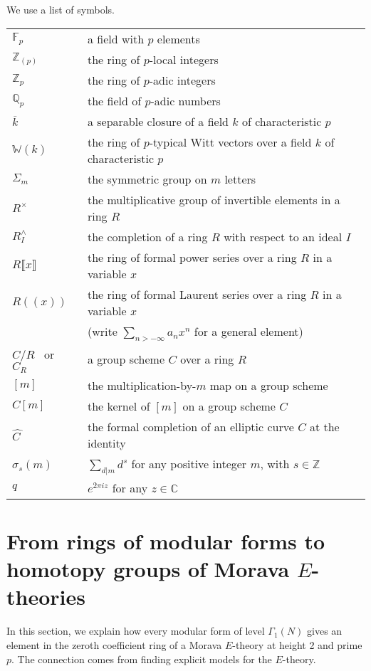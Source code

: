 \documentclass{gtpart}
\theoremstyle{definition}
\theoremstyle{remark}
\newcommand{\mb}[1]{\mathbb{#1}}
\newcommand{\BC}{{\mb C}}
\newcommand{\BF}{{\mb F}}
\newcommand{\BQ}{{\mb Q}}
\newcommand{\BW}{{\mb W}}
\newcommand{\BZ}{{\mb Z}}
\newcommand{\HC}{\widehat{C~}\!}
\newcommand{\G}{\Gamma}
\newcommand{\si}{\sigma}
\newcommand{\lb}{\llbracket}
\newcommand{\rb}{\rrbracket}
\renewcommand{\=}{\approx}
\renewcommand{\-}{\sim}
\numberwithin{equation}{section}
\numberwithin{thm}{section}
\begin{document}
We use a list of symbols.  
\begin{center}
\begin{tabular}{ll}
 $\BF_p$ & a field with $p$ elements \\
 $\BZ_{(p)}$ & the ring of $p$-local integers \\
 $\BZ_p$ & the ring of $p$-adic integers \\
 $\BQ_p$ & the field of $p$-adic numbers \\
 $\overline{k}$ & a separable closure of a field $k$ of characteristic $p$ \\
 $\BW(k)$ & the ring of $p$-typical Witt vectors over a field $k$ of characteristic $p$ \\
 $\Sigma_m$ & the symmetric group on $m$ letters \\
 $R^\times$ & the multiplicative group of invertible elements in a ring $R$ \\
 $R_I^\wedge$ & the completion of a ring $R$ with respect to an ideal $I$ \\
 $R\lb x \rb$ & the ring of formal power series over a ring $R$ in a variable $x$ \\
 $R(\!(x)\!)$ & the ring of formal Laurent series over a ring $R$ in a variable $x$ \\
              & (write $\sum_{n > -\infty} a_n x^n$ for a general element) \\
 $C/R$ \, or \, $C_R$ & a group scheme $C$ over a ring $R$ \\
 $[m]$ & the multiplication-by-$m$ map on a group scheme \\
 $C[m]$ & the kernel of $[m]$ on a group scheme $C$ \\
 $\HC$ & the formal completion of an elliptic curve $C$ at the identity \\
 $\si_s(m)$ & $\sum_{d|m} d^s$ for any positive integer $m$, with $s \in \BZ$ \\
 $q$ & $e^{2 \pi i z}$ for any $z \in \BC$ 
\end{tabular}
\end{center}



\section{From rings of modular forms to homotopy groups of Morava $E$-theories}
\label{sec:mf2E}

In this section, we explain how every modular form of level $\G_1(N)$ gives an element in 
the zeroth coefficient ring of a Morava $E$-theory at height 2 and prime $p$.  The connection comes from finding explicit models for the $E$-theory.  
\end{document}
